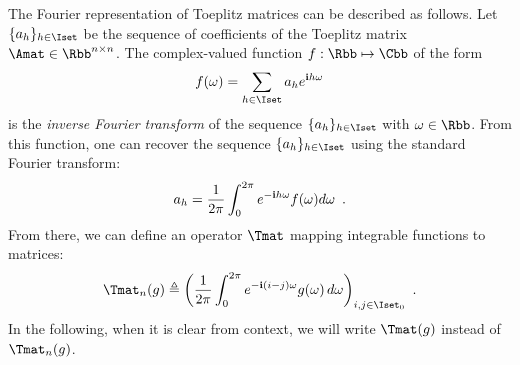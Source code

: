 %
%
%
%


The Fourier representation of Toeplitz matrices can be described as follows.
Let $\{a_h\}_{h \in \Iset}$ be the sequence of coefficients of the Toeplitz matrix $\Amat \in \Rbb^{n\times n}$.
The complex-valued function $f: \Rbb \mapsto \Cbb$ of the form
\begin{equation}
  f(\omega) = \sum_{h \in \Iset} a_h e^{\ci h \omega}
\end{equation}
is the \emph{inverse Fourier transform} of the sequence $\{a_h\}_{h \in \Iset}$ with $\omega \in \Rbb$.
From this function, one can recover the sequence $\{a_h\}_{h \in \Iset}$ using the standard Fourier transform:
\begin{equation}
  a_h = \frac{1}{2\pi} \int_0^{2\pi} e^{-\mathbf{i} h \omega} f(\omega) d\omega \enspace.
\end{equation}
\noindent
From there, we can define an operator $\Tmat$ mapping integrable functions to matrices:
\begin{equation} \label{equation:ch2-toeplitz_operator}
  \Tmat_n(g) \triangleq \leftmat\frac{1}{2\pi}\int_{0}^{2\pi}e^{-\ci(i-j)\omega}g(\omega)\,d\omega\rightmat_{i,j \in \Iset_0} \enspace.
\end{equation}
In the following, when it is clear from context, we will write $\Tmat(g)$ instead of $\Tmat_n(g)$.






